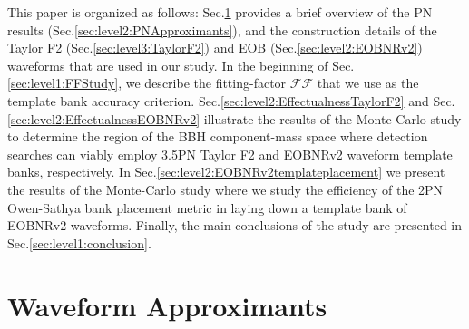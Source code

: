 \documentclass[aps,
prd,
amsmath,
amssymb,
twocolumn,
floatfix,
groupedaddress]{revtex4-1}
\newcommand{\FF}{\mathcal{FF}}
\begin{document}
This paper is organized as follows:
Sec.\ref{sec:level1:WaveformApproximants} provides a brief overview of the PN results (Sec.\ref{sec:level2:PNApproximants}), and the construction details of the Taylor F2 (Sec.\ref{sec:level3:TaylorF2}) and EOB (Sec.\ref{sec:level2:EOBNRv2}) waveforms that are used in our study. In the beginning of Sec.\ref{sec:level1:FFStudy}, we describe the fitting-factor $\FF$ that we use as the template bank accuracy criterion. Sec.\ref{sec:level2:EffectualnessTaylorF2} and Sec.\ref{sec:level2:EffectualnessEOBNRv2} illustrate the results of the Monte-Carlo study to determine the region of the BBH component-mass space where detection searches can viably employ 3.5PN Taylor F2 and EOBNRv2 waveform template banks, respectively. In Sec.\ref{sec:level2:EOBNRv2templateplacement} we present the results of the Monte-Carlo study where we study the efficiency of the 2PN Owen-Sathya bank placement metric in laying down a template bank of EOBNRv2 waveforms. Finally, the main conclusions of the study are presented in Sec.\ref{sec:level1:conclusion}.


\section{Waveform Approximants}\label{sec:level1:WaveformApproximants}
\end{document}
